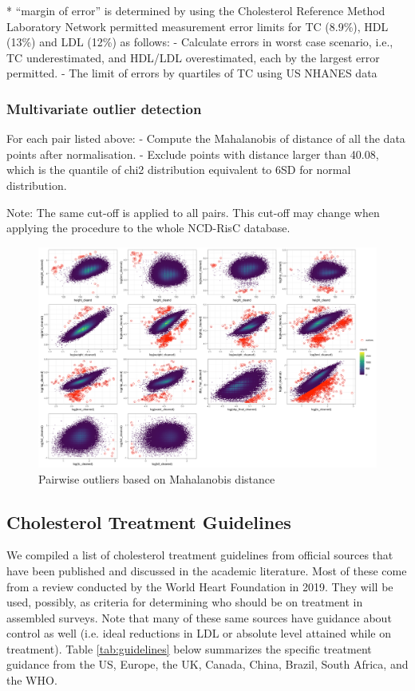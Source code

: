 \documentclass[12pt]{article}
\begin{document}
\begin{appendix}
* “margin of error” is determined by using the Cholesterol Reference Method Laboratory Network permitted measurement error limits for TC (8.9\%), HDL (13\%) and LDL (12\%) as follows:
-	Calculate errors in worst case scenario, i.e., TC underestimated, and HDL/LDL overestimated, each by the largest error permitted.
-	The limit of errors by quartiles of TC using US NHANES data

    \subsubsection{Multivariate outlier detection}

    For each pair listed above:
-	Compute the Mahalanobis of distance of all the data points after normalisation.
-	Exclude points with distance larger than 40.08, which is the quantile of chi2 distribution equivalent to 6SD for normal distribution.

Note: The same cut-off is applied to all pairs. This cut-off may change when applying the procedure to the whole NCD-RisC database.

\begin{figure}[H]
    \centering
    \includegraphics[width = \linewidth]{../3_figures/mahalanobis.png}
    \caption{Pairwise outliers based on Mahalanobis distance}
    \label{fig:pairs}
\end{figure}


    \subsection{Cholesterol Treatment Guidelines}

    We compiled a list of cholesterol treatment guidelines from official sources that have been published and discussed in the academic literature. Most of these come from a review conducted by the World Heart Foundation in 2019. They will be used, possibly, as criteria for determining who should be on treatment in assembled surveys. Note that many of these same sources have guidance about control as well (i.e. ideal reductions in LDL or absolute level attained while on treatment). Table \ref{tab:guidelines} below summarizes the specific treatment guidance from the US, Europe, the UK, Canada, China, Brazil, South Africa, and the WHO. 


\end{appendix}
\end{document}
